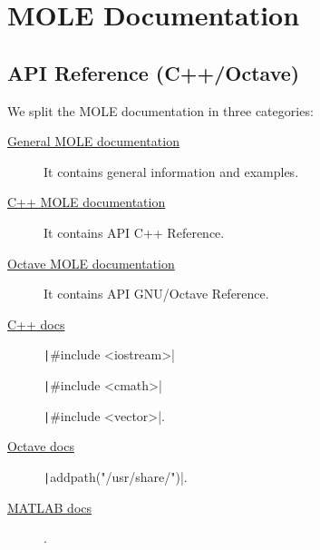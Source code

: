\chapter{MOLE Documentation}

\section{API Reference (C++/Octave)}

We split the MOLE documentation in three categories:

\begin{description}
	\item[\href{https://carlosal1015.github.io/mole_examples/html}{General MOLE documentation}]

	      It contains general information and examples.

	\item[\href{https://carlosal1015.github.io/mole_examples/doxygen/cpp/html}{C++ MOLE documentation}]

	      It contains API C++ Reference.

	\item[\href{https://carlosal1015.github.io/mole_examples/doxygen/matlab}{Octave MOLE documentation}]

	      It contains API GNU/Octave Reference.
\end{description}


\begin{description}
	\item[\href{https://en.cppreference.com}{C++ docs}]

	      \texttt|#include <iostream>|

	      \texttt|#include <cmath>|

	      \texttt|#include <vector>|.

	\item[\href{https://docs.octave.org}{Octave docs}]

	      \texttt|addpath("/usr/share/")|.

	\item[\href{https://www.mathworks.com/help/matlab/index.html}{MATLAB docs}]

	      .
\end{description}

